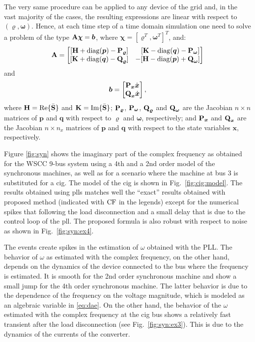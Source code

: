 \documentclass[journal, twocolumn, letter]{IEEEtran}
\newcommand{\bfg}[1]{\boldsymbol{#1}}
\newcommand{\bfb}[1]{\boldsymbol{\rm #1}}
\renewcommand{\Re}{{\rm Re}}
\renewcommand{\Im}{{\rm Im}}
\newcommand{\xdot}{\dot{\bfg x}}
\newcommand{\rhovec}{\bfg \varrho}
\newcommand{\wvec}{\bfg \omega}
\newcommand{\Sbus}{\bar{\bfb S}}
\begin{document}
The very same procedure can be applied to any device of the grid and,
in the vast majority of the cases, the resulting expressions are
linear with respect to $(\rhovec, \wvec)$.  Hence, at each time step
of a time domain simulation one need to solve a problem of the type
$\bfb A \bfg \chi = \bfg b$, where
$\bfg \chi = [\rhovec^T, \wvec^T]^T$, and:
\begin{equation}
  \bfb A =
  \begin{bmatrix}
    [\bfb H + {\rm diag}(\bfg p) - \bfb P_{\rhovec}] &
    \phantom{-}[\bfb K - {\rm diag}(\bfg q) - \bfb P_{\wvec}] \\ 
    [\bfb K + {\rm diag}(\bfg q) - \bfb Q_{\rhovec}] &
    -[\bfb H - {\rm diag}(\bfg p) + \bfb Q_{\wvec}] 
  \end{bmatrix} 
\end{equation}
and
\begin{equation}
  \bfg b =
  \begin{bmatrix}
    \bfb P_{\bfg x} \xdot \\
    \bfb Q_{\bfg x} \xdot
  \end{bmatrix} ,
\end{equation}
where $\bfb H = \Re\{\Sbus\}$ and $\bfb K = \Im\{\Sbus\}$;
$\bfb P_{\rhovec}$, $\bfb P_{\wvec}$, $\bfb Q_{\rhovec}$ and
$\bfb Q_{\wvec}$ are the Jacobian $n \times n$ matrices of $\bfg p$
and $\bfg q$ with respect to $\rhovec$ and $\wvec$, respectively; and
$\bfb P_{\bfg x}$ and $\bfb Q_{\bfg x}$ are the Jacobian
$n \times n_x$ matrices of $\bfg p$ and $\bfg q$ with respect to the
state variables $\bfg x$, respectively.









Figure \ref{fig:syn} shows the imaginary part of the complex frequency
as obtained for the WSCC 9-bus system using a 4th and a 2nd order
model of the synchronous machines, as well as for a scenario where the
machine at bus 3 is substituted for a \ac{cig}.  The model of the
\ac{cig} is shown in Fig.~\ref{fig:cig:model}.  The results obtained
using \acp{pll} matches well the ``exact'' results obtained with
proposed method (indicated with $\rm CF$ in the legends) except for
the numerical spikes that following the load disconnection and a small
delay that is due to the control loop of the \ac{pll}.  The proposed
formula is also robust with respect to noise as shown in
Fig.~\ref{fig:syn:ex4}.

The events create spikes in the estimation of $\omega$ obtained with
the PLL.  The behavior of $\omega$ as estimated with the complex
frequency, on the other hand, depends on the dynamics of the device
connected to the bus where the frequency is estimated.  It is smooth
for the 2nd order synchronous machine and show a small jump for the
4th order synchronous machine.  The latter behavior is due to the
dependence of the frequency on the voltage magnitude, which is modeled
as an algebraic variable in \eqref{eq:dae}.  On the other hand, the
behavior of the $\omega$ estimated with the complex frequency at the
\ac{cig} bus shows a relatively fast transient after the load
disconnection (see Fig.~\ref{fig:syn:ex3}). This is due to the
dynamics of the currents of the converter.
\end{document}
